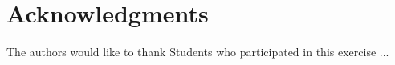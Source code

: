 \section*{Acknowledgments}
\label{sec:acknowledgments}

The authors would like to thank Students who participated in this exercise ...


